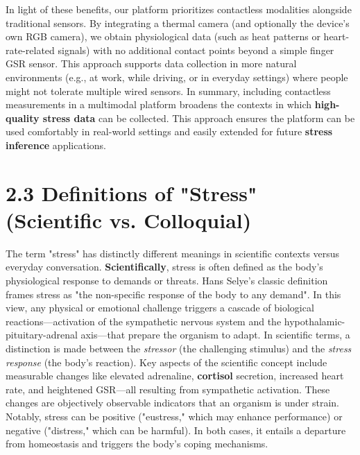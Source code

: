\documentclass[11pt,a4paper]{report}
\begin{document}
In light of these benefits, our platform prioritizes contactless modalities alongside traditional sensors. By integrating a thermal camera (and optionally the device's own RGB camera), we obtain physiological data (such as heat patterns or heart-rate-related signals) with no additional contact points beyond a simple finger GSR sensor. This approach supports data collection in more natural environments (e.g., at work, while driving, or in everyday settings) where people might not tolerate multiple wired sensors. In summary, including contactless measurements in a multimodal platform broadens the contexts in which \textbf{high-quality stress data} can be collected. This approach ensures the platform can be used comfortably in real-world settings and easily extended for future \textbf{stress inference} applications.

\section{2.3 Definitions of "Stress" (Scientific vs. Colloquial)}

The term "stress" has distinctly different meanings in scientific contexts versus everyday conversation. \textbf{Scientifically}, stress is often defined as the body's physiological response to demands or threats. Hans Selye's classic definition frames stress as "the non-specific response of the body to any demand"\cite{StressDefinitionHH}. In this view, any physical or emotional challenge triggers a cascade of biological reactions—activation of the sympathetic nervous system and the hypothalamic-pituitary-adrenal axis—that prepare the organism to adapt. In scientific terms, a distinction is made between the \textit{stressor} (the challenging stimulus) and the \textit{stress response} (the body's reaction). Key aspects of the scientific concept include measurable changes like elevated adrenaline, \textbf{cortisol} secretion, increased heart rate, and heightened GSR—all resulting from sympathetic activation\cite{CortisolStressIndicator2020}. These changes are objectively observable indicators that an organism is under strain. Notably, stress can be positive ("eustress," which may enhance performance) or negative ("distress," which can be harmful). In both cases, it entails a departure from homeostasis and triggers the body's coping mechanisms.
\end{document}
